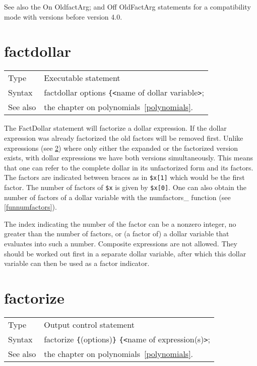 See also the On OldfactArg; and Off OldFactArg statements for a 
compatibility mode with versions before version 4.0.
\vspace{10mm}


\section{factdollar}
\label{substafactdollar}

\noindent \begin{tabular}{ll}
Type & Executable statement\\
Syntax & factdollar options \verb:{:{\tt<}name of dollar variable{\tt>};
\\ See also & the chapter on polynomials~\ref{polynomials}.
\end{tabular} \vspace{4mm}

\noindent The FactDollar statement will factorize a dollar expression. If 
the dollar expression was already factorized the old factors will be 
removed first. Unlike expressions (see \ref{substafactorize}) where only 
either the expanded or the factorized version exists, with dollar 
expressions we have both versions simultaneously. This means that one can 
refer to the complete dollar in its unfactorized form and its factors. The 
factors are indicated between braces as in \verb:$x[1]: which would be the 
first factor. The number of factors of \verb:$x: is given by \verb:$x[0]:. 
One can also obtain the number of factors of a dollar variable with the 
numfactors\_ function (see \ref{funnumfactors}).

\noindent The index indicating the number of the factor can be a nonzero 
integer, no greater than the number of factors, or (a factor of) a dollar 
variable that evaluates into such a number. Composite expressions are not 
allowed. They should be worked out first in a separate dollar variable, 
after which this dollar variable can then be used as a factor indicator.
\vspace{10mm}


\section{factorize}
\label{substafactorize}

\noindent \begin{tabular}{ll}
Type & Output control statement\\
Syntax & factorize \verb:{:(options)\verb:}: \verb:{:{\tt<}name of expression(s){\tt>};
\\ See also & the chapter on polynomials~\ref{polynomials}.
\end{tabular} \vspace{4mm}

